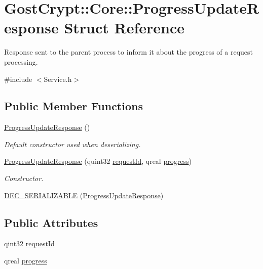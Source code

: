 \hypertarget{struct_gost_crypt_1_1_core_1_1_progress_update_response}{}\section{Gost\+Crypt\+:\+:Core\+:\+:Progress\+Update\+Response Struct Reference}
\label{struct_gost_crypt_1_1_core_1_1_progress_update_response}


Response sent to the parent process to inform it about the progress of a request processing.  




{\ttfamily \#include $<$Service.\+h$>$}

\subsection*{Public Member Functions}
\begin{DoxyCompactItemize}
\item 
\hyperlink{struct_gost_crypt_1_1_core_1_1_progress_update_response_ac2423e7f4c5ae83a26e0845d758aae8c}{Progress\+Update\+Response} ()
\begin{DoxyCompactList}\small\item\em Default constructor used when deserializing. \end{DoxyCompactList}\item 
\hyperlink{struct_gost_crypt_1_1_core_1_1_progress_update_response_af901841a3b3883946ccff14ed87c69ee}{Progress\+Update\+Response} (quint32 \hyperlink{struct_gost_crypt_1_1_core_1_1_progress_update_response_afe056ab386502612ab55ac0933e24361}{request\+Id}, qreal \hyperlink{struct_gost_crypt_1_1_core_1_1_progress_update_response_a1d0053c0054485f9ea095c2a151b0232}{progress})
\begin{DoxyCompactList}\small\item\em Constructor. \end{DoxyCompactList}\item 
\hyperlink{struct_gost_crypt_1_1_core_1_1_progress_update_response_a370588f845184095b75f40f9f3ff52a2}{D\+E\+C\+\_\+\+S\+E\+R\+I\+A\+L\+I\+Z\+A\+B\+LE} (\hyperlink{struct_gost_crypt_1_1_core_1_1_progress_update_response}{Progress\+Update\+Response})
\end{DoxyCompactItemize}
\subsection*{Public Attributes}
\begin{DoxyCompactItemize}
\item 
qint32 \hyperlink{struct_gost_crypt_1_1_core_1_1_progress_update_response_afe056ab386502612ab55ac0933e24361}{request\+Id}
\item 
qreal \hyperlink{struct_gost_crypt_1_1_core_1_1_progress_update_response_a1d0053c0054485f9ea095c2a151b0232}{progress}
\end{DoxyCompactItemize}


